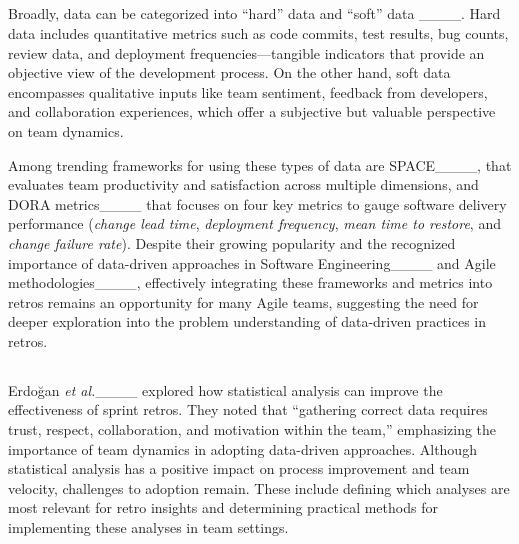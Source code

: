 \subsection{}
\label{sec_background_data}

Broadly, data can be categorized into ``hard'' data and ``soft'' data ____. Hard data includes quantitative metrics  such as code commits, test results, bug counts, review data, and deployment frequencies—tangible indicators that provide an objective view of the development process. On the other hand, soft data encompasses qualitative inputs like team sentiment, feedback from developers, and collaboration experiences, which offer a subjective but valuable perspective on team dynamics.

Among trending frameworks for using these types of data are SPACE____, that evaluates team productivity and satisfaction across multiple dimensions, and DORA metrics____ that focuses on four key metrics to gauge software delivery performance (\textit{change lead time}, \textit{deployment frequency}, \textit{mean time to restore}, and \textit{change failure rate}). 
Despite their growing popularity and the recognized importance of data-driven approaches in Software Engineering____ and Agile methodologies____, effectively integrating these frameworks and metrics into retros remains an opportunity for many Agile teams, suggesting the need for deeper exploration into the problem understanding of data-driven practices in retros. 

\subsection{}
\label{sec_background_rw}

Erdoğan \textit{et al.}____ explored how statistical analysis can improve the effectiveness of sprint retros. They noted that ``gathering correct data requires trust, respect, collaboration, and motivation within the team,'' emphasizing the importance of team dynamics in adopting data-driven approaches. Although statistical analysis has a positive impact on process improvement and team velocity, challenges to adoption remain. These include defining which analyses are most relevant for retro insights and determining practical methods for implementing these analyses in team settings.


